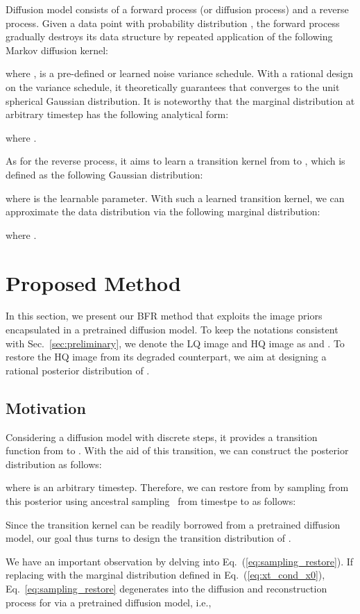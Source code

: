 \documentclass[10pt,twocolumn,letterpaper]{article}
\begin{document}
Diffusion model consists of a forward process (or diffusion process) and a reverse process. Given a data point  with probability distribution , the forward process gradually destroys its data structure by repeated application of the following Markov diffusion kernel:

where ,  is a pre-defined or learned noise variance schedule. With a rational design on the variance schedule, it theoretically guarantees that  converges to the unit spherical Gaussian distribution. It is noteworthy that the marginal distribution at arbitrary timestep  has the following analytical form: 

where .

As for the reverse process, it aims to learn a transition kernel from  to , which is defined as the following Gaussian distribution:

where  is the learnable parameter. With such a learned transition kernel, we can approximate the data distribution  via the following marginal distribution:

where .

\section{Proposed Method} \label{sec:method}
In this section, we present our BFR method that exploits the image priors encapsulated in a pretrained diffusion model. To keep the notations consistent with Sec.~\ref{sec:preliminary}, we denote the LQ image and HQ image as  and . To restore the HQ image from its degraded counterpart, we aim at designing a rational posterior distribution of .

\subsection{Motivation} \label{subsec:motivation}
Considering a diffusion model with  discrete steps, it provides a transition function from  to . With the aid of this transition, we can construct the posterior distribution  as follows:

where  is an arbitrary timestep. Therefore, we can restore  from  by sampling from this posterior using ancestral sampling~\cite{bishop2006pattern} from timestpe  to  as follows:

Since the transition kernel  can be readily borrowed from a pretrained diffusion model, our goal thus turns to design the transition distribution of .

We have an important observation by delving into Eq.~(\ref{eq:sampling_restore}). If replacing  with the marginal distribution  defined in Eq.~(\ref{eq:xt_cond_x0}), Eq.~\eqref{eq:sampling_restore} degenerates into the diffusion and reconstruction process for  via a pretrained diffusion model, i.e.,
\end{document}
